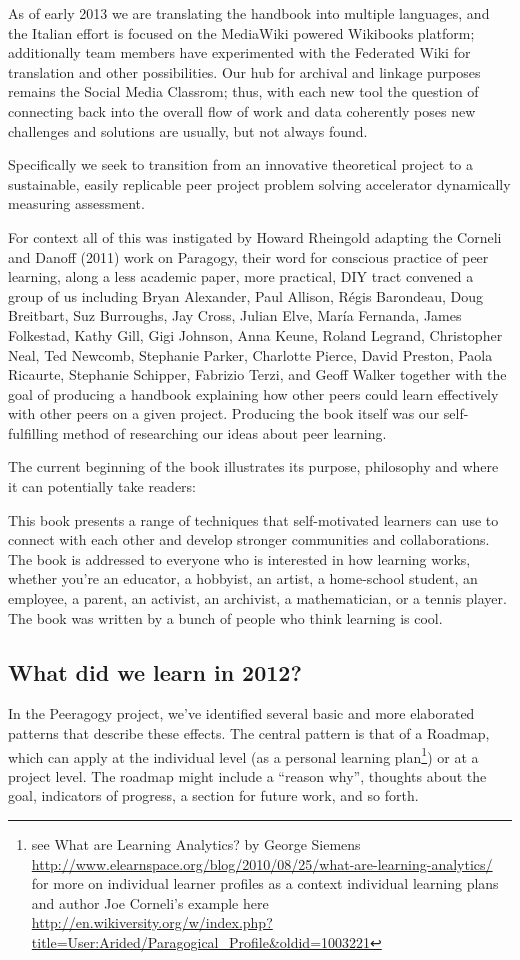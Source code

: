 \documentclass{acm_proc_article-sp}
\begin{document}
As of early 2013 we are translating the handbook into multiple languages, and the Italian effort is focused on the MediaWiki powered Wikibooks platform; additionally team members have experimented with the Federated Wiki for translation and other possibilities. Our hub for archival and linkage purposes remains the Social Media Classrom; thus, with each new tool the question of connecting back into the overall flow of work and data coherently poses new challenges and solutions are usually, but not always found.

Specifically we seek to transition from an innovative theoretical project to a sustainable, easily replicable peer project problem solving accelerator dynamically measuring assessment.

For context all of this was instigated by Howard Rheingold adapting the Corneli and Danoff (2011) work on Paragogy, their word for conscious practice of peer learning, along a less academic paper, more practical, DIY tract convened a group of us including Bryan Alexander, Paul Allison, R\'egis Barondeau, Doug Breitbart, Suz Burroughs, Jay Cross, Julian Elve, Mar\'ia Fernanda, James Folkestad, Kathy Gill, Gigi Johnson, Anna Keune, Roland Legrand, Christopher Neal, Ted Newcomb, Stephanie Parker, Charlotte Pierce, David Preston, Paola Ricaurte, Stephanie Schipper, Fabrizio Terzi, and Geoff Walker together with the goal of producing a handbook explaining how other peers could learn effectively with other peers on a given project. Producing the book itself was our self-fulfilling method of researching our ideas about peer learning.

The current beginning of the book illustrates its purpose, philosophy and where it can potentially take readers:

This book presents a range of techniques that self-motivated learners can use to connect with each other and develop stronger communities and collaborations. The book is addressed to everyone who is interested in how learning works, whether you’re an educator, a hobbyist, an artist, a home-school student, an employee, a parent, an activist, an archivist, a mathematician, or a tennis player.  The book was written by a bunch of people who think learning is cool.

\subsection{What did we learn in 2012?}

In the Peeragogy project, we've identified several basic and more elaborated patterns that describe these effects. The central pattern is that of a Roadmap, which can apply at the individual level (as a personal learning plan\footnote{see What are Learning Analytics? by George Siemens \url{http://www.elearnspace.org/blog/2010/08/25/what-are-learning-analytics/} for more on individual learner profiles as a context individual learning plans and author Joe Corneli's example here  \url{http://en.wikiversity.org/w/index.php?title=User:Arided/Paragogical\_Profile&oldid=1003221}}) or at a project level. The roadmap might include a ``reason why'', thoughts about the goal, indicators of progress, a section for future work, and so forth. 
\end{document}
